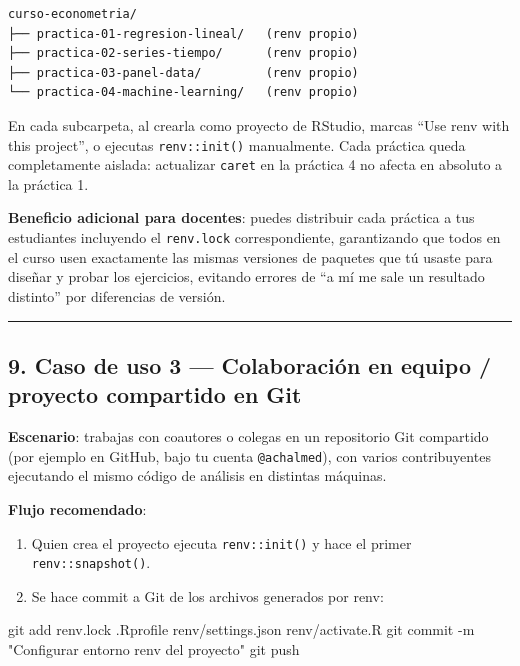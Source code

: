 \documentclass[
  man,
  floatsintext,
  longtable,
  a4paper,
  nolmodern,
  notxfonts,
  notimes,
  12pt,
  colorlinks=true,linkcolor=blue,citecolor=blue,urlcolor=blue]{apa7}
\newenvironment{Shaded}{\begin{snugshade}}{\end{snugshade}}
\newcommand{\AttributeTok}[1]{\textcolor[rgb]{0.40,0.45,0.13}{#1}}
\newcommand{\FunctionTok}[1]{\textcolor[rgb]{0.28,0.35,0.67}{#1}}
\newcommand{\NormalTok}[1]{\textcolor[rgb]{0.00,0.23,0.31}{#1}}
\newcommand{\StringTok}[1]{\textcolor[rgb]{0.13,0.47,0.30}{#1}}
\providecommand{\tightlist}{%
  \setlength{\itemsep}{0pt}\setlength{\parskip}{0pt}}
\begin{document}
\begin{verbatim}
curso-econometria/
├── practica-01-regresion-lineal/   (renv propio)
├── practica-02-series-tiempo/      (renv propio)
├── practica-03-panel-data/         (renv propio)
└── practica-04-machine-learning/   (renv propio)
\end{verbatim}

En cada subcarpeta, al crearla como proyecto de RStudio, marcas ``Use
renv with this project'', o ejecutas \texttt{renv::init()} manualmente.
Cada práctica queda completamente aislada: actualizar \texttt{caret} en
la práctica 4 no afecta en absoluto a la práctica 1.

\textbf{Beneficio adicional para docentes}: puedes distribuir cada
práctica a tus estudiantes incluyendo el \texttt{renv.lock}
correspondiente, garantizando que todos en el curso usen exactamente las
mismas versiones de paquetes que tú usaste para diseñar y probar los
ejercicios, evitando errores de ``a mí me sale un resultado distinto''
por diferencias de versión.

\begin{center}\rule{0.5\linewidth}{0.5pt}\end{center}

\subsection{9. Caso de uso 3 --- Colaboración en equipo / proyecto
compartido en
Git}\label{caso-de-uso-3-colaboraciuxf3n-en-equipo-proyecto-compartido-en-git}

\textbf{Escenario}: trabajas con coautores o colegas en un repositorio
Git compartido (por ejemplo en GitHub, bajo tu cuenta
\texttt{@achalmed}), con varios contribuyentes ejecutando el mismo
código de análisis en distintas máquinas.

\textbf{Flujo recomendado}:

\begin{enumerate}
\def\labelenumi{\arabic{enumi}.}
\tightlist
\item
  Quien crea el proyecto ejecuta \texttt{renv::init()} y hace el primer
  \texttt{renv::snapshot()}.
\item
  Se hace commit a Git de los archivos generados por renv:
\end{enumerate}

\begin{Shaded}
\begin{Highlighting}[]
\FunctionTok{git}\NormalTok{ add renv.lock .Rprofile renv/settings.json renv/activate.R}
\FunctionTok{git}\NormalTok{ commit }\AttributeTok{{-}m} \StringTok{"Configurar entorno renv del proyecto"}
\FunctionTok{git}\NormalTok{ push}
\end{Highlighting}
\end{Shaded}
\end{document}
